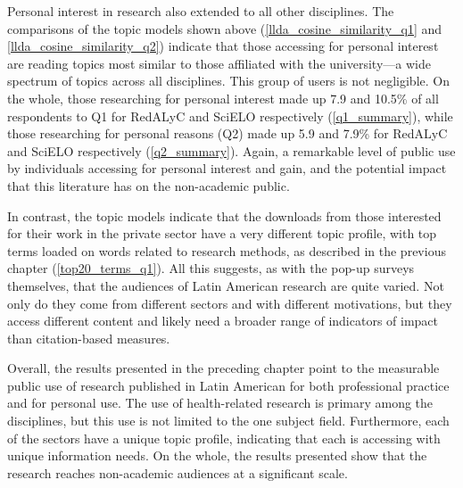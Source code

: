 Personal interest in research also extended to all other disciplines. The comparisons of the topic models shown above (\autoref{llda_cosine_similarity_q1} and \autoref{llda_cosine_similarity_q2}) indicate that those accessing for personal interest are reading topics most similar to those affiliated with the university—a wide spectrum of topics across all disciplines. This group of users is not negligible. On the whole, those researching for personal interest made up 7.9 and 10.5\% of all respondents to Q1 for RedALyC and SciELO respectively (\autoref{q1_summary}), while those researching for personal reasons (Q2) made up 5.9 and 7.9\% for RedALyC and SciELO respectively (\autoref{q2_summary}). Again, a remarkable level of public use by individuals accessing for personal interest and gain, and the potential impact that this literature has on the non-academic public.

In contrast, the topic models indicate that the downloads from those interested for their work in the private sector have a very different topic profile, with top terms loaded on words related to research methods, as described in the previous chapter (\autoref{top20_terms_q1}). All this suggests, as with the pop-up surveys themselves, that the audiences of Latin American research are quite varied. Not only do they come from different sectors and with different motivations, but they access different content and likely need a broader range of indicators of impact than citation-based measures.

Overall, the results presented in the preceding chapter point to the measurable public use of research published in Latin American for both professional practice and for personal use. The use of health-related research is primary among the disciplines, but this use is not limited to the one subject field. Furthermore, each of the sectors have a unique topic profile, indicating that each is accessing with unique information needs. On the whole, the results presented show that the research reaches non-academic audiences at a significant scale.

